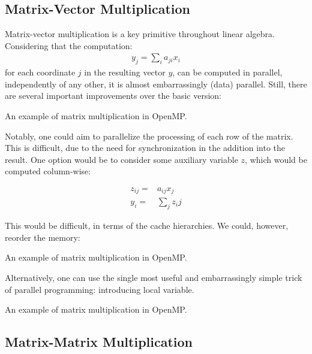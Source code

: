 \subsection{Matrix-Vector Multiplication}


Matrix-vector multiplication is a key primitive throughout 
linear algebra. Considering that the computation:
\begin{align}
    y_j= \sum_{i} a_{ji} x_i
\end{align}
for each coordinate $j$ in the resulting vector $y$,
can be computed in parallel, independently of any other,
it is almost embarrassingly (data) parallel. Still,
there are several important improvements over the basic version:  

\begin{codebox}[breakable]{}
\footnotesize An example of matrix multiplication in OpenMP.
\tcblower
{}
\end{codebox}

Notably, one could aim to parallelize the processing of each row
of the matrix. This is difficult, due to the need for synchronization
in the addition into the result. 
One option would be to consider some auxiliary variable $z$,
which would be computed column-wise:

\begin{align}
z_{ij} = & a_{ij} x_j\\
y_i    = & \sum_{j} z_ij
\end{align}

This would be difficult, in terms of the cache hierarchies. 
We could, however, reorder the memory:

\begin{codebox}[breakable]{}
\footnotesize An example of matrix multiplication in OpenMP.
\tcblower
{}
\end{codebox}

Alternatively, one can use the single most useful 
and embarrassingly simple trick of parallel programming:
introducing local variable. 

\begin{codebox}[breakable]{}
\footnotesize An example of matrix multiplication in OpenMP.
\tcblower
{}
\end{codebox}

\subsection{Matrix-Matrix Multiplication}

